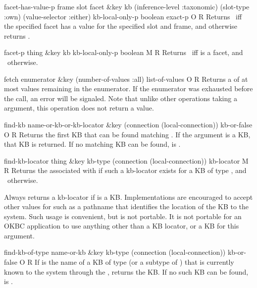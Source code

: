 \begin{okbcop}{facet-has-value-p}{ frame slot facet \&key kb (inference-level :taxonomic) (slot-type :own) (value-selector :either) kb-local-only-p} { boolean exact-p } { O } { R } {  }
Returns \true\ iff the specified facet has a value for the specified slot
   and frame, and otherwise returns \false.
\end{okbcop}

\begin{okbcop}{facet-p}{ thing \&key kb kb-local-only-p} { boolean } { M } { R } {  }
Returns \true\ iff  is a facet, and \false\ otherwise.
\end{okbcop}

\begin{okbcop}{fetch}{ enumerator \&key (number-of-values :all)} { list-of-values } { O } { R } {  }
Returns a  of at most
    values remaining in the enumerator.  If the
   enumerator was exhausted before the call,
   an  error will be signaled.  Note that unlike
   other operations taking a  argument, this operation
   does not return a  value.
\end{okbcop}

\begin{okbcop}{find-kb}{ name-or-kb-or-kb-locator \&key (connection (local-connection))} { kb-or-false } { O } { R } {  }
Returns the first KB that can be found matching
   .
   If the argument is a KB, that KB is returned.  If no matching KB can be
   found,  is \false.
\end{okbcop}

\begin{okbcop}{find-kb-locator}{ thing \&key kb-type (connection (local-connection))} { kb-locator } { M } { R } {  }
Returns the  associated with  if such
   a kb-locator exists for a KB of type , and \false\
   otherwise.

   Always returns a kb-locator if  is a KB.  Implementations
   are encouraged to accept other values for \karg{thing} such as a pathname
   that identifies the location of the KB to the system.  Such usage is
   convenient, but is not portable.  It is not portable for an OKBC application
   to use anything other than a KB locator, or a KB for this argument.
\end{okbcop}

\begin{okbcop}{find-kb-of-type}{ name-or-kb \&key kb-type (connection (local-connection))} { kb-or-false } { O } { R } {  }
If \karg{name-or-kb} is the name of a KB of type  (or a
   subtype of \karg{kb-type}) that is
   currently known to the system through the ,
    returns the KB.  If no such KB can be found,
   \karg{kb-or-false} is \false.
\end{okbcop}

